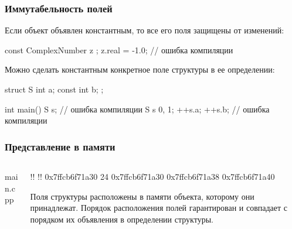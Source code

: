 \documentclass[compress, 8pt]{beamer}
\begin{document}
\begin{frame}[fragile]

    \frametitle{Иммутабельность полей}

    \hfill\break
    Если объект объявлен константным, то все его поля защищены от изменений:

    \begin{myinplacelisting}[minted language=cpp]
const ComplexNumber z {};
z.real = -1.0; // ошибка компиляции
    \end{myinplacelisting}

    Можно сделать константным конкретное поле структуры в ее определении:

    \begin{myinplacelisting}[minted language=cpp]
struct S {
    int a;
    const int b;
};

int main() {
    S s; // ошибка компиляции
    S s {0, 1};
    ++s.a;
    ++s.b; // ошибка компиляции
}
    \end{myinplacelisting}

\end{frame}

\begin{frame}[fragile]

    \frametitle{Представление в памяти}

    \begin{columns}[T]

        \begin{column}{0.5\textwidth}

                {main.cpp}

        \end{column}

        \begin{column}{0.5\textwidth}

            \begin{terminalwindow}
!!
!!
0x7ffcb6f71a30
24
0x7ffcb6f71a30
0x7ffcb6f71a38
0x7ffcb6f71a40
            \end{terminalwindow}

            Поля структуры расположены в памяти объекта, которому они принадлежат.
            Порядок расположения полей гарантирован и совпадает с порядком их
            объявления в определении структуры.

        \end{column}

    \end{columns}

\end{frame}
\end{document}
